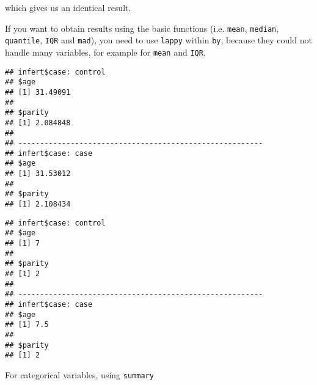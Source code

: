 \documentclass[]{book}
\newenvironment{Shaded}{\begin{snugshade}}{\end{snugshade}}
\newcommand{\KeywordTok}[1]{\textcolor[rgb]{0.13,0.29,0.53}{\textbf{{#1}}}}
\newcommand{\StringTok}[1]{\textcolor[rgb]{0.31,0.60,0.02}{{#1}}}
\newcommand{\NormalTok}[1]{{#1}}
\theoremstyle{definition}
\theoremstyle{definition}
\theoremstyle{remark}
\begin{document}
which gives us an identical result.

If you want to obtain results using the basic functions (i.e.
\texttt{mean}, \texttt{median}, \texttt{quantile}, \texttt{IQR} and
\texttt{mad}), you need to use \texttt{lappy} within \texttt{by},
because they could not handle many variables, for example for
\texttt{mean} and \texttt{IQR},

\begin{Shaded}
\end{Shaded}

\begin{verbatim}
## infert$case: control
## $age
## [1] 31.49091
## 
## $parity
## [1] 2.084848
## 
## -------------------------------------------------------- 
## infert$case: case
## $age
## [1] 31.53012
## 
## $parity
## [1] 2.108434
\end{verbatim}

\begin{Shaded}
\end{Shaded}

\begin{verbatim}
## infert$case: control
## $age
## [1] 7
## 
## $parity
## [1] 2
## 
## -------------------------------------------------------- 
## infert$case: case
## $age
## [1] 7.5
## 
## $parity
## [1] 2
\end{verbatim}

For categorical variables, using \texttt{summary}

\begin{Shaded}
\end{Shaded}
\end{document}
